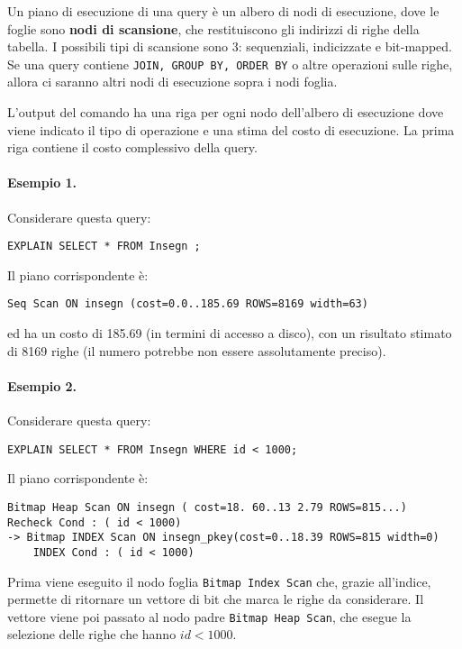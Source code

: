 \documentclass[a4paper, 10pt]{article}
\begin{document}
	Un piano di esecuzione di una query è un albero di nodi di esecuzione, dove le foglie sono \textbf{nodi di scansione}, che restituiscono gli indirizzi di righe della tabella. I possibili tipi di scansione sono 3: sequenziali, indicizzate e bit-mapped. Se una query contiene \lstinline|JOIN, GROUP BY, ORDER BY| o altre operazioni sulle righe, allora ci saranno altri nodi di esecuzione sopra i nodi foglia.
	
	L'output del comando ha una riga per ogni nodo dell'albero di esecuzione dove viene indicato il tipo di operazione e una stima del costo di esecuzione. La prima riga contiene il costo complessivo della query.
	
	\paragraph{Esempio 1.}
	Considerare questa query:
	\begin{lstlisting}
EXPLAIN SELECT * FROM Insegn ;
	\end{lstlisting}
	Il piano corrispondente è:
	\begin{lstlisting}
Seq Scan ON insegn (cost=0.0..185.69 ROWS=8169 width=63)
	\end{lstlisting}
	ed ha un costo di 185.69 (in termini di accesso a disco), con un risultato stimato di 8169 righe (il numero potrebbe non essere assolutamente preciso).
	
	\paragraph{Esempio 2.} 
	Considerare questa query:
	\begin{lstlisting}
EXPLAIN SELECT * FROM Insegn WHERE id < 1000;
	\end{lstlisting}
	Il piano corrispondente è:
	\begin{lstlisting}
Bitmap Heap Scan ON insegn ( cost=18. 60..13 2.79 ROWS=815...)
Recheck Cond : ( id < 1000)
-> Bitmap INDEX Scan ON insegn_pkey(cost=0..18.39 ROWS=815 width=0)
	INDEX Cond : ( id < 1000)
	\end{lstlisting}
	Prima viene eseguito il nodo foglia \lstinline|Bitmap Index Scan| che, grazie all'indice, permette di ritornare un vettore di bit che marca le righe da considerare. Il vettore viene poi passato al nodo padre \lstinline|Bitmap Heap Scan|, che esegue la selezione delle righe che hanno $id < 1000$.
	
\end{document}
